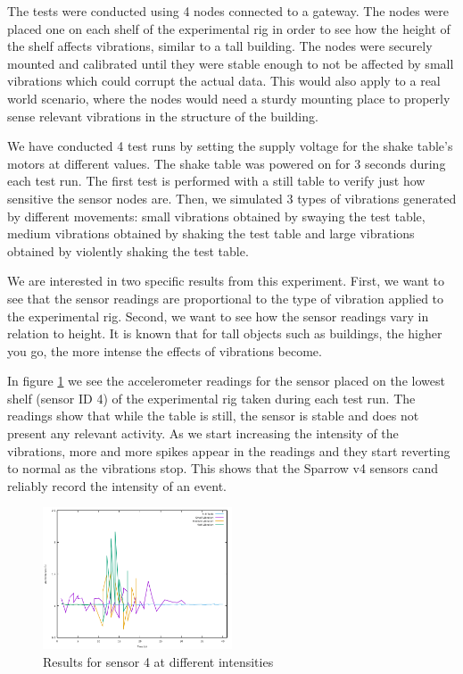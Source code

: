 The tests were conducted using 4 nodes connected to a gateway. The nodes were placed one on each shelf of the experimental rig in order to see how the height of the shelf affects vibrations, 
similar to a tall building. The nodes were securely mounted and calibrated until they were stable enough to not be affected by small vibrations which could corrupt the actual data. 
This would also apply to a real world scenario, where the nodes would need a sturdy mounting place to properly sense relevant vibrations in the structure of the building.

We have conducted 4 test runs by setting the supply voltage for the shake table's motors at different values. The shake table was powered on for 3 seconds during each test run. The first test is performed with a still table to verify just how sensitive the sensor nodes are. Then, we simulated 3 types of vibrations generated by different movements: small vibrations obtained by swaying the test table, medium vibrations obtained by shaking the test table and large vibrations obtained by 
violently shaking the test table.

We are interested in two specific results from this experiment. First, we want to see that the sensor readings are proportional to the type of vibration applied to 
the experimental rig. Second, we want to see how the sensor readings vary in relation to height. It is known that for tall objects such as buildings, the higher you 
go, the more intense the effects of vibrations become.

In figure \ref{fig:sensor-4} we see the accelerometer readings for the sensor placed on the lowest shelf (sensor ID 4) of the experimental rig taken during each test run. The
readings show that while the table is still, the sensor is stable and does not present any relevant activity. As we start increasing the intensity of the vibrations,
more and more spikes appear in the readings and they start reverting to normal as the vibrations stop. This shows that the Sparrow v4 sensors cand reliably record 
the intensity of an event.

\begin{figure}[ht] \centering
  \includegraphics[width=0.5\textwidth]{img/sensor-4-data}
  \caption{Results for sensor 4 at different intensities}
  \label{fig:sensor-4}
\end{figure}

